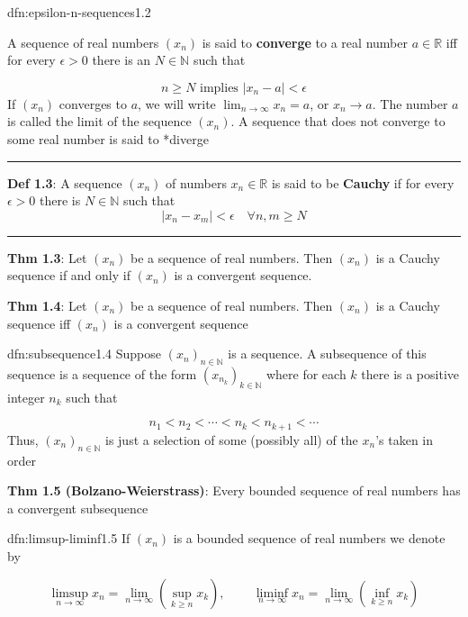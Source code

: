 \documentclass[landscape, 8pt]{extarticle}
\begin{document}
\begin{multicols}{3}
\begin{dfn}{dfn:epsilon-n-sequences}{1.2}

	A sequence of real numbers $(x_{n})$ is said to \textbf{converge} to a real number $a\in \mathbb{R}$ iff for every $\epsilon>0$ there is an $N\in\mathbb{N}$ such that

	\[n\ge N \text{ implies } \lvert x_{n} - a \rvert < \epsilon\]
	If $(x_{n})$ converges to $a$, we will write $\lim_{n \to \infty} x_{n}=a$, or $x_{n}\to a$. The number $a$ is called the limit of the sequence $(x_{n})$. A sequence that does not converge to some real number is said to *diverge

	\noindent\rule{\textwidth}{0.2pt}
	\textbf{Def 1.3}: A sequence $(x_{n})$ of numbers $x_{n} \in \mathbb{R}$ is said to be \textbf{Cauchy} if for every $\epsilon > 0$ there is $N\in \mathbb{N}$ such that
	\[\lvert x_{n} - x_{m} \rvert < \epsilon \quad \forall n,m\ge N\]

	\noindent\rule{\textwidth}{0.2pt}
	\textbf{Thm 1.3}: Let $(x_{n})$ be a sequence of real numbers. Then $(x_{n})$ is a Cauchy sequence if and only if $(x_{n})$ is a convergent sequence.

	\textbf{Thm 1.4}: Let $(x_{n})$ be a sequence of real numbers. Then $(x_{n})$ is a Cauchy sequence iff $(x_{n})$ is a convergent sequence
\end{dfn}

\begin{dfn}[Subsequences]{dfn:subsequence}{1.4}
	Suppose $(x_{n})_{n\in\mathbb{N}}$ is a sequence. A subsequence of this sequence is a sequence of the form $(x_{n_{k}})_{k\in\mathbb{N}}$ where for each $k$ there is a positive integer $n_{k}$ such that

	\[n_{1} < n_{2} < \cdots < n_{k} < n_{k+1} < \cdots\]
	Thus, $(x_{n})_{n\in\mathbb{N}}$ is just a selection of some (possibly all) of the $x_{n}$'s taken in order

	\textbf{Thm 1.5 (Bolzano-Weierstrass)}: Every bounded sequence of real numbers has a convergent subsequence
\end{dfn}


\begin{dfn}{dfn:limsup-liminf}{1.5}
	If $(x_{n})$ is a bounded sequence of real numbers we denote by

	\vspace{-5pt}
	\[\limsup_{{n\to\infty}} x_{n} = \lim_{n \to \infty} \left(\displaystyle \sup_{k\ge n} x_{k}\right),\,\qquad \liminf_{{n\to\infty}} x_{n} = \lim_{n \to \infty} \left(\displaystyle \inf_{k\ge n} x_{k}\right)\]


\end{dfn}
\end{multicols}
\end{document}
